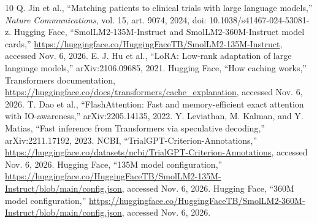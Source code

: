 \documentclass[conference]{IEEEtran}
\begin{document}
\balance
\begin{thebibliography}{10}
 Q. Jin et al., ``Matching patients to clinical trials with large language models,'' \emph{Nature Communications}, vol. 15, art. 9074, 2024, doi: 10.1038/s41467-024-53081-z.
 Hugging Face, ``SmolLM2-135M-Instruct and SmolLM2-360M-Instruct model cards,'' \url{https://huggingface.co/HuggingFaceTB/SmolLM2-135M-Instruct}, accessed Nov. 6, 2026.
 E. J. Hu et al., ``LoRA: Low-rank adaptation of large language models,'' arXiv:2106.09685, 2021.
 Hugging Face, ``How caching works,'' Transformers documentation, \url{https://huggingface.co/docs/transformers/cache_explanation}, accessed Nov. 6, 2026.
 T. Dao et al., ``FlashAttention: Fast and memory-efficient exact attention with IO-awareness,'' arXiv:2205.14135, 2022.
 Y. Leviathan, M. Kalman, and Y. Matias, ``Fast inference from Transformers via speculative decoding,'' arXiv:2211.17192, 2023.
 NCBI, ``TrialGPT-Criterion-Annotations,'' \url{https://huggingface.co/datasets/ncbi/TrialGPT-Criterion-Annotations}, accessed Nov. 6, 2026.
 Hugging Face, ``135M model configuration,'' \url{https://huggingface.co/HuggingFaceTB/SmolLM2-135M-Instruct/blob/main/config.json}, accessed Nov. 6, 2026.
 Hugging Face, ``360M model configuration,'' \url{https://huggingface.co/HuggingFaceTB/SmolLM2-360M-Instruct/blob/main/config.json}, accessed Nov. 6, 2026.
\end{thebibliography}
\end{document}
